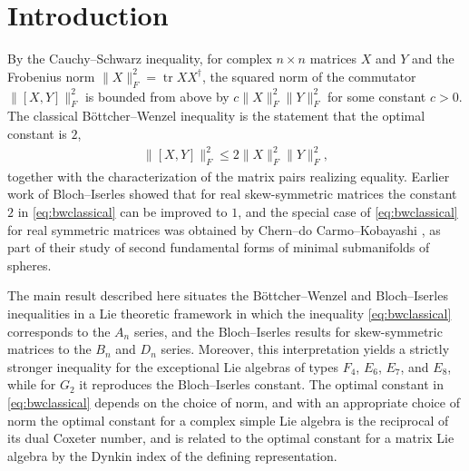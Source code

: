 \documentclass [leqno, 10pt]{amsart}
\theoremstyle{definition}
\numberwithin{equation}{section}
\newcommand{\tr}{\operatorname{tr}}
\newcommand{\fnorm}[1]{\lVert #1\rVert_{F}}
\begin{document}
\maketitle

\setcounter{tocdepth}{1}%

\tableofcontents

\section{Introduction}\label{sec:intro}
By the Cauchy--Schwarz inequality, for complex $n \times n$ matrices $X$ and $Y$ and the Frobenius norm $\fnorm{X}^{2} = \tr X X^{\dagger}$, the squared norm of the commutator $\fnorm{[X, Y]}^{2}$ is bounded from above by $c\fnorm{X}^2 \fnorm{Y}^2$ for some constant $c > 0$. The classical Böttcher--Wenzel inequality \cite{Audenaert, Bottcher-Wenzel-howbig, Bottcher-Wenzel, Lu-normalscalarcurvature} is the statement that the optimal constant is $2$,
\begin{align}\label{eq:bwclassical}
\fnorm{[X, Y]}^{2} \leq 2 \fnorm{X}^2 \fnorm{Y}^2,
\end{align}
together with the characterization of the matrix pairs realizing equality. Earlier work of Bloch--Iserles \cite{Bloch-Iserles} showed that for real skew-symmetric matrices the constant $2$ in \eqref{eq:bwclassical} can be improved to $1$, and the special case of \eqref{eq:bwclassical} for real symmetric matrices was obtained by Chern--do Carmo--Kobayashi \cite{Chern-Docarmo-Kobayashi}, as part of their study of second fundamental forms of minimal submanifolds of spheres. 

The main result described here situates the Böttcher--Wenzel and Bloch--Iserles inequalities in a Lie theoretic framework in which the inequality \eqref{eq:bwclassical} corresponds to the $A_{n}$ series, and the Bloch--Iserles results for skew-symmetric matrices to the $B_{n}$ and $D_{n}$ series. Moreover, this interpretation yields a strictly stronger inequality for the exceptional Lie algebras of types $F_{4}$, $E_{6}$, $E_{7}$, and $E_{8}$, while for $G_{2}$ it reproduces the Bloch--Iserles constant. The optimal constant in \eqref{eq:bwclassical} depends on the choice of norm, and with an appropriate choice of norm the optimal constant for a complex simple Lie algebra is the reciprocal of its dual Coxeter number, and is related to the optimal constant for a matrix Lie algebra by the Dynkin index of the defining representation. 
\end{document}
